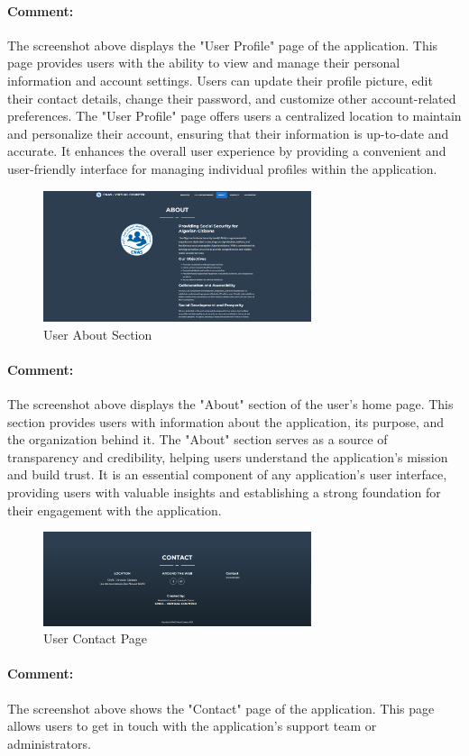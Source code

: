 \begin{itemize}
\paragraph{Comment:} The screenshot above displays the "User Profile" page of the application. This page provides users with the ability to view and manage their personal information and account settings. Users can update their profile picture, edit their contact details, change their password, and customize other account-related preferences. The "User Profile" page offers users a centralized location to maintain and personalize their account, ensuring that their information is up-to-date and accurate. It enhances the overall user experience by providing a convenient and user-friendly interface for managing individual profiles within the application.

\begin{figure}[htbp]
    \centering
    \includegraphics[width=0.7\textwidth]{SCREENSHOTS/user/about.png}
    \caption{User About Section}
    \label{fig:user-about}
\end{figure}
\paragraph{Comment:} The screenshot above displays the "About" section of the user's home page. This section provides users with information about the application, its purpose, and the organization behind it. The "About" section serves as a source of transparency and credibility, helping users understand the application's mission and build trust. It is an essential component of any application's user interface, providing users with valuable insights and establishing a strong foundation for their engagement with the application.
\newpage
\begin{figure}[htbp]
    \centering
    \includegraphics[width=0.7\textwidth]{SCREENSHOTS/user/contact.png}
    \caption{User Contact Page}
    \label{fig:user-contact}
\end{figure}
\paragraph{Comment:} The screenshot above shows the "Contact" page of the application. This page allows users to get in touch with the application's support team or administrators.
\end{itemize}

